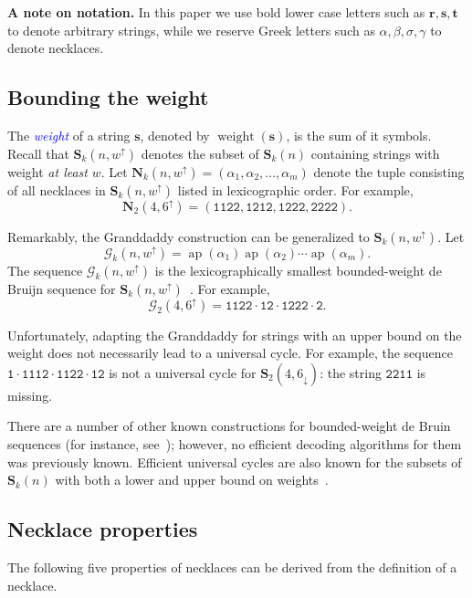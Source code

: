 \documentclass[US-letter,USenglish,authorcolumns,autoref]{lipics-v2021}
\renewcommand{\tt} {\mathtt}
\newcommand{\bS}{\mathbf{S}}
\newcommand{\bN}{\mathbf{N}}
\newcommand{\bs}{\mathbf{s}}
\newcommand{\br}{\mathbf{r}}
\newcommand{\bt}{\mathbf{t}}
\newcommand{\defo}[1] {\emph{\textcolor{blue}{#1}}}
\DeclareMathOperator{\wt}{weight}
\DeclareMathOperator{\ap}{ap}
\begin{document}
\medskip
\noindent
{\bf A note on notation.} In this paper we use bold lower case letters such as $\br,\bs, \bt$ to denote arbitrary strings, while we reserve Greek letters such as $\alpha, \beta,\sigma, \gamma$ to denote necklaces.

%

\subsection{Bounding the weight}
The \defo{weight} of a string $\bs$, denoted by $\wt(\bs)$, is the sum of it symbols.  Recall that $\bS_k(n,w^\uparrow)$ denotes the subset of $\bS_k(n)$ containing strings with weight \emph{at least} $w$.
Let $\bN_k(n,w^\uparrow) = (\alpha_1,\alpha_2, \ldots, \alpha_{m})$ denote the tuple consisting of all necklaces in $\bS_k(n,w^\uparrow)$ listed in lexicographic order.  For example, 
%
\[ \bN_2(4,6^\uparrow) =  ( \tt{1122, 1212, 1222, 2222} ). \]
%

\noindent
Remarkably, the Granddaddy construction can be generalized to $\bS_k(n,w^\uparrow)$.
Let
\[\mathcal{G}_k(n,w^\uparrow) = \ap(\alpha_1) \ap(\alpha_2)  \cdots \ap(\alpha_{m}).  \] 
%
The sequence $\mathcal{G}_k(n,w^\uparrow)$ is the lexicographically smallest bounded-weight de Bruijn sequence for $\bS_k(n,w^\uparrow)$~\cite{weight1,generalize-classic-greedy}.
For example,
%
\[ \mathcal{G}_2(4,6^\uparrow)  = \tt{ 1122 \cdot 12 \cdot 1222 \cdot 2}.\]
%

\noindent
Unfortunately, adapting the Granddaddy for strings with an upper bound on the weight does not necessarily lead to a universal cycle.  For example,  the sequence $\tt{1 \cdot 1112 \cdot 1122 \cdot 12}$ is not a universal cycle for $\bS_2(4,6_\downarrow)$: the string $\tt{2211}$ is missing.

There are a number of other known constructions for bounded-weight de Bruin sequences (for instance, see~\cite{weight1,generalize-classic-greedy,karyframework,concattree}); however, no efficient decoding algorithms for them was previously known. Efficient universal cycles are also known for the subsets of $\bS_k(n)$ with both a lower and upper bound on weights~\cite{sawada2013}.  

\subsection{Necklace properties}

The following five properties of necklaces can be derived from the definition of a necklace.
\end{document}
